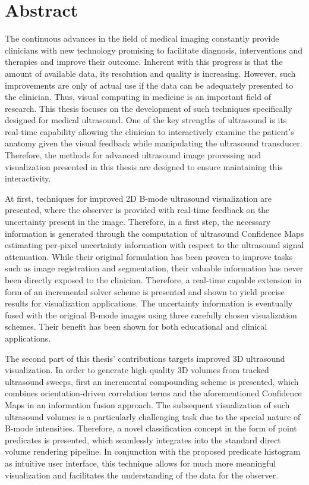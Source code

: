 %
\chapter*{Abstract}
\label{sec:abstract}
\vspace*{-10mm}

The continuous advances in the field of medical imaging constantly provide clinicians with new technology promising to facilitate diagnosis, interventions and therapies and improve their outcome.
Inherent with this progress is that the amount of available data, its resolution and quality is  increasing.
However, such improvements are only of actual use if the data can be adequately presented to the clinician.
Thus, visual computing in medicine is an important field of research.
This thesis focuses on the development of such techniques specifically designed for medical ultrasound.
One of the key strengths of ultrasound is its real-time capability allowing the clinician to interactively examine the patient's anatomy given the visual feedback while manipulating the ultrasound transducer.
Therefore, the methods for advanced ultrasound image processing and visualization presented in this thesis are designed to ensure maintaining this interactivity.

At first, techniques for improved 2D B-mode ultrasound visualization are presented, where the observer is provided with real-time feedback on the uncertainty present in the image.
Therefore, in a first step, the necessary information is generated through the computation of ultrasound Confidence Maps estimating per-pixel uncertainty information with respect to the ultrasound signal attenuation.
While their original formulation has been proven to improve tasks such as image registration and segmentation, their valuable information has never been directly exposed to the clinician.
Therefore, a real-time capable extension in form of an incremental solver scheme is presented and shown to yield precise results for visualization applications.
The uncertainty information is eventually fused with the original B-mode images using three carefully chosen visualization schemes.
Their benefit has been shown for both educational and clinical applications.

The second part of this thesis' contributions targets improved 3D ultrasound visualization.
In order to generate high-quality 3D volumes from tracked ultrasound sweeps, first an incremental compounding scheme is presented, which combines orientation-driven correlation terms and the aforementioned Confidence Maps in an information fusion approach.
The subsequent visualization of such ultrasound volumes is a particularly challenging task due to the special nature of B-mode intensities.
Therefore, a novel classification concept in the form of point predicates is presented, which seamlessly integrates into the standard direct volume rendering pipeline.
In conjunction with the proposed predicate histogram as intuitive user interface, this technique allows for much more meaningful visualization and facilitates the understanding of the data for the observer.

%
%
